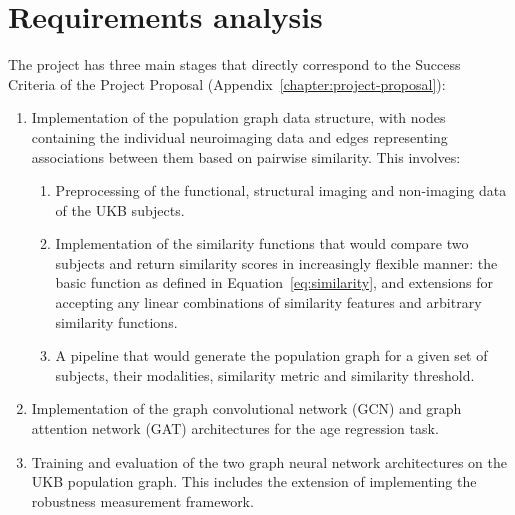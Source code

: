

\section{Requirements analysis}
\label{section:requirements-analysis}

The project has three main stages that directly correspond to the Success Criteria of the Project Proposal (Appendix~\ref{chapter:project-proposal}):

\begin{enumerate}[label=S\arabic*.]
    \item Implementation of the population graph data structure, with nodes containing the individual neuroimaging data and edges representing associations between them based on pairwise similarity. This involves: \begin{enumerate}[label=\theenumi\arabic*.]
        \item Preprocessing of the functional, structural imaging and non-imaging data of the UKB subjects.
        \item Implementation of the similarity functions that would compare two subjects and return similarity scores in increasingly flexible manner: the basic function as defined in Equation~\eqref{eq:similarity}, and extensions for accepting any linear combinations of similarity features and arbitrary similarity functions.
        \item A pipeline that would generate the population graph for a given set of subjects, their modalities, similarity metric and similarity threshold.
    \end{enumerate}
    \item Implementation of the graph convolutional network (GCN) and graph attention network (GAT) architectures for the age regression task. 
    \item Training and evaluation of the two graph neural network architectures on the UKB population graph. This includes the extension of implementing the robustness measurement framework.
\end{enumerate}

